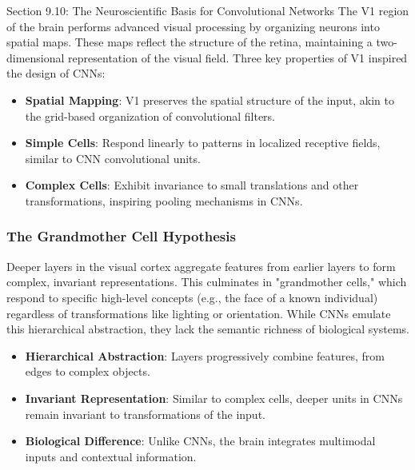 \begin{notes}{Section 9.10: The Neuroscientific Basis for Convolutional Networks}
    The V1 region of the brain performs advanced visual processing by organizing neurons into spatial maps. These maps reflect the structure of the retina, maintaining a two-dimensional representation of the 
    visual field. Three key properties of V1 inspired the design of CNNs:
    
    \begin{highlight}
        \begin{itemize}
            \item \textbf{Spatial Mapping}: V1 preserves the spatial structure of the input, akin to the grid-based organization of convolutional filters.
            \item \textbf{Simple Cells}: Respond linearly to patterns in localized receptive fields, similar to CNN convolutional units.
            \item \textbf{Complex Cells}: Exhibit invariance to small translations and other transformations, inspiring pooling mechanisms in CNNs.
        \end{itemize}
    \end{highlight}
    
    \subsubsection*{The Grandmother Cell Hypothesis}
    
    Deeper layers in the visual cortex aggregate features from earlier layers to form complex, invariant representations. This culminates in "grandmother cells," which respond to specific high-level concepts 
    (e.g., the face of a known individual) regardless of transformations like lighting or orientation. While CNNs emulate this hierarchical abstraction, they lack the semantic richness of biological systems.
    
    \begin{highlight}
        \begin{itemize}
            \item \textbf{Hierarchical Abstraction}: Layers progressively combine features, from edges to complex objects.
            \item \textbf{Invariant Representation}: Similar to complex cells, deeper units in CNNs remain invariant to transformations of the input.
            \item \textbf{Biological Difference}: Unlike CNNs, the brain integrates multimodal inputs and contextual information.
        \end{itemize}
    \end{highlight}
    

\end{notes}
